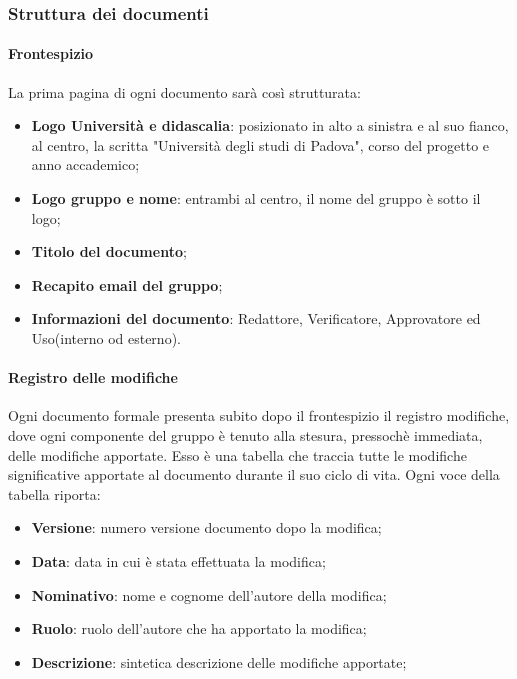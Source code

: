	\subsubsection{Struttura dei documenti}
		\paragraph*{Frontespizio}
		\aCapo{}    
			La prima pagina di ogni documento sarà così strutturata:
				\begin{itemize}
					\item \textbf{Logo Università e didascalia}: posizionato in alto a sinistra e al suo fianco, al centro, la scritta "Università degli studi di Padova", corso del progetto e anno accademico;
					\item \textbf{Logo gruppo e nome}: entrambi al centro, il nome del gruppo è sotto il logo;
					\item \textbf{Titolo del documento};
					\item \textbf{Recapito email del gruppo};
					\item \textbf{Informazioni del documento}: Redattore, Verificatore, Approvatore ed Uso(interno od esterno).
				\end{itemize}
			
		\paragraph*{Registro delle modifiche}
		\aCapo{}  
			Ogni documento formale presenta subito dopo il frontespizio il registro modifiche, dove ogni componente del gruppo è tenuto alla stesura, pressochè immediata, delle modifiche apportate.
			Esso è una tabella che traccia tutte le modifiche significative apportate al documento durante il suo ciclo di vita. Ogni voce della tabella riporta:
				\begin{itemize}
					\item \textbf{Versione}: numero versione documento dopo la modifica;
					\item \textbf{Data}: data in cui è stata effettuata la modifica;
					\item \textbf{Nominativo}: nome e cognome dell'autore della modifica;
					\item \textbf{Ruolo}: ruolo dell'autore che ha apportato la modifica;
					\item \textbf{Descrizione}: sintetica descrizione delle modifiche apportate;
				\end{itemize}
	
